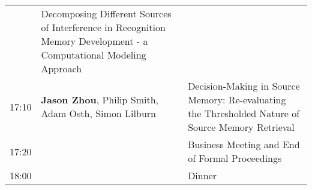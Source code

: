 \documentclass[]{article}
\begin{document}
\begin{longtable}[]{@{}lll@{}}
\begin{minipage}[t]{0.32\columnwidth}
\end{minipage} & \begin{minipage}[t]{0.57\columnwidth}\raggedright\strut
Decomposing Different Sources of Interference in Recognition Memory
Development - a Computational Modeling Approach\strut
\end{minipage}\tabularnewline
\begin{minipage}[t]{0.03\columnwidth}\raggedright\strut
17:10\strut
\end{minipage} & \begin{minipage}[t]{0.32\columnwidth}\raggedright\strut
\textbf{Jason Zhou}, Philip Smith, Adam Osth, Simon Lilburn\strut
\end{minipage} & \begin{minipage}[t]{0.57\columnwidth}\raggedright\strut
Decision-Making in Source Memory: Re-evaluating the Thresholded Nature
of Source Memory Retrieval\strut
\end{minipage}\tabularnewline
\begin{minipage}[t]{0.03\columnwidth}\raggedright\strut
17:20\strut
\end{minipage} & \begin{minipage}[t]{0.32\columnwidth}\raggedright\strut
\strut
\end{minipage} & \begin{minipage}[t]{0.57\columnwidth}\raggedright\strut
Business Meeting and End of Formal Proceedings\strut
\end{minipage}\tabularnewline
\begin{minipage}[t]{0.03\columnwidth}\raggedright\strut
18:00\strut
\end{minipage} & \begin{minipage}[t]{0.32\columnwidth}\raggedright\strut
\strut
\end{minipage} & \begin{minipage}[t]{0.57\columnwidth}\raggedright\strut
Dinner\strut
\end{minipage}\tabularnewline
\bottomrule
\end{longtable}
\end{document}
